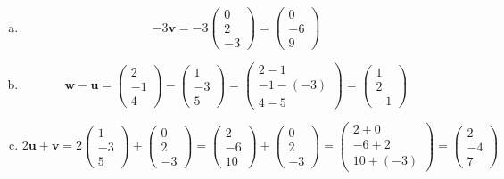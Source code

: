 \documentclass[11pt,letterpaper]{article}
\begin{document}
\sol 
\begin{enumerate}[(a)]
\item 
	\[
	-3 \mathbf{v}= -3 \begin{pmatrix} 0 \\ 2 \\ -3 \end{pmatrix}= \begin{pmatrix} 0 \\ -6 \\ 9 \end{pmatrix}
	\] \pspace

\item 
	\[
	\mathbf{w} - \mathbf{u}= \begin{pmatrix} 2 \\ -1 \\ 4 \end{pmatrix} - \begin{pmatrix} 1 \\ -3 \\ 5 \end{pmatrix}= \begin{pmatrix} 2 - 1 \\ -1 - (-3) \\ 4 - 5 \end{pmatrix}= \begin{pmatrix} 1 \\ 2 \\ -1 \end{pmatrix}
	\] \pspace

\item 
	\[
	2\mathbf{u} + \mathbf{v}= 2 \begin{pmatrix} 1 \\ -3 \\ 5 \end{pmatrix} + \begin{pmatrix} 0 \\ 2 \\ -3 \end{pmatrix}= \begin{pmatrix} 2 \\ -6 \\ 10 \end{pmatrix} + \begin{pmatrix} 0 \\ 2 \\ -3 \end{pmatrix}= \begin{pmatrix} 2 + 0 \\ -6 + 2 \\ 10 + (-3) \end{pmatrix}= \begin{pmatrix} 2 \\ -4 \\ 7 \end{pmatrix}
	\] \pspace


\end{enumerate}
\end{document}
